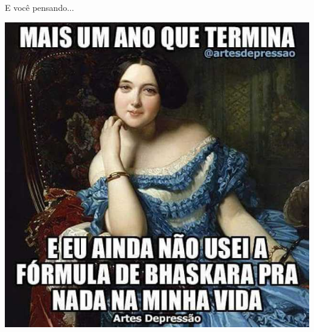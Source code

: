 \documentclass{beamer}
\begin{document}
\begin{frame}{\scriptsize E você pensando...}
    \begin{center}
      \includegraphics[height=.8\textheight]{Cap18-19/bhaskara}
    \end{center}
\end{frame}
\end{document}
